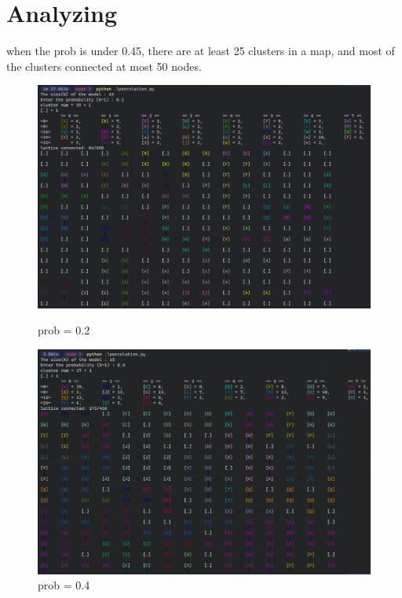 \documentclass{article}
\begin{document}
\section{Analyzing}

when the prob is under 0.45, there are at least 25 clusters in a map, and most of the clusters connected at most 50 nodes. 


\begin{figure}[h]
   \begin{minipage}{0.48\textwidth}
     \centering
     \includegraphics[width=1\linewidth]{percolation result with size = 15/size_15_prob_0.2.png}
     \caption{prob = 0.2}\label{prob = 0.2}
   \end{minipage}\hfill
   \begin{minipage}{0.48\textwidth}
     \centering
     \includegraphics[width=1\linewidth]{percolation result with size = 15/size_15_prob_0.4.png}
     \caption{prob = 0.4}\label{prob = 0.4}
   \end{minipage}
\end{figure}
\end{document}
